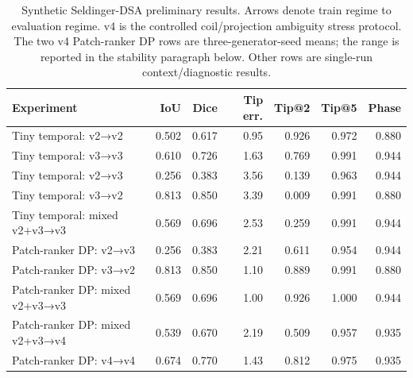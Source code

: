 \documentclass[10pt]{article}
\begin{document}
\begin{table}[h]
\centering
\small
\begin{tabular}{lrrrrrr}
\toprule
Experiment & IoU & Dice & Tip err. & Tip@2 & Tip@5 & Phase \\
\midrule
Tiny temporal: v2→v2 & 0.502 & 0.617 & 0.95 & 0.926 & 0.972 & 0.880 \\
Tiny temporal: v3→v3 & 0.610 & 0.726 & 1.63 & 0.769 & 0.991 & 0.944 \\
Tiny temporal: v2→v3 & 0.256 & 0.383 & 3.56 & 0.139 & 0.963 & 0.944 \\
Tiny temporal: v3→v2 & 0.813 & 0.850 & 3.39 & 0.009 & 0.991 & 0.880 \\
Tiny temporal: mixed v2+v3→v3 & 0.569 & 0.696 & 2.53 & 0.259 & 0.991 & 0.944 \\
Patch-ranker DP: v2→v3 & 0.256 & 0.383 & 2.21 & 0.611 & 0.954 & 0.944 \\
Patch-ranker DP: v3→v2 & 0.813 & 0.850 & 1.10 & 0.889 & 0.991 & 0.880 \\
Patch-ranker DP: mixed v2+v3→v3 & 0.569 & 0.696 & 1.00 & 0.926 & 1.000 & 0.944 \\
Patch-ranker DP: mixed v2+v3→v4 & 0.539 & 0.670 & 2.19 & 0.509 & 0.957 & 0.935 \\
Patch-ranker DP: v4→v4 & 0.674 & 0.770 & 1.43 & 0.812 & 0.975 & 0.935 \\
\bottomrule
\end{tabular}
\caption{Synthetic Seldinger-DSA preliminary results. Arrows denote train regime to evaluation regime. v4 is the controlled coil/projection ambiguity stress protocol. The two v4 Patch-ranker DP rows are three-generator-seed means; the range is reported in the stability paragraph below. Other rows are single-run context/diagnostic results.}
\end{table}
\end{document}
